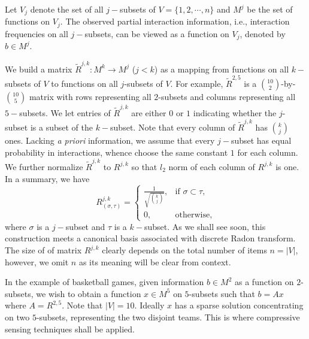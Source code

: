 \documentclass{article}
\begin{document}
Let $V_j$ denote the set of all $j-$subsets of $V=\{1,2,\cdots, n\}$ and $M^j$ be the set of functions on $V_j$. 
The observed partial interaction information, i.e., interaction frequencies on all $j-$subsets, can be viewed
as a function on $V_j$, denoted by $b\in M^j$.

We build a matrix $\tilde{R}^{j,k}:M^k \to M^j$ ($j<k$) as a mapping from functions on all $k-$subsets of $V$ to functions 
on all $j$-subsets of $V$. For example, $\tilde{R}^{2,5}$ is a ${10\choose 2}$-by-${10\choose 5}$ matrix
with rows representing all $2$-subsets and columns representing all $5-$subsets. We let
entries of $\tilde{R}^{j,k}$ are either $0$ or $1$ indicating whether the $j$-subset is a subset of
the $k-$subset. Note that every column of $\tilde{R}^{j,k}$ has ${k\choose j}$ ones. 
Lacking {\it a priori} information, we assume that every $j-$subset has equal probability in interactions, 
whence choose the same constant $1$ for each column. 
We further normalize $\tilde{R}^{j,k}$ to $R^{j,k}$ so that $l_2$ norm of each column of $R^{j,k}$ is one. In a summary, we have  
\begin{equation} \label{eq:radonmat}
R^{j,k}_{(\sigma,\tau)}=\left\{\begin{array}{cc} \frac{1}{\sqrt{{k \choose j}}}, & \mbox{if } \sigma\subset \tau, \\ 0, & \mbox{otherwise}, \end{array}\right.
\end{equation}
where $\sigma$ is a $j-$subset and $\tau$ is a $k-$subset. As we shall see soon, this construction meets a canonical basis associated with discrete Radon transform.
The size of of matrix $R^{j,k}$ clearly depends on the total number of items $n=|V|$, however, 
we omit $n$ as its meaning will be clear from context. 

In the example of basketball games, given information $b\in M^2$ as a function on $2$-subsets, we wish to obtain a function $x\in M^5$
on $5$-subsets such that $b=Ax$ where $A=R^{2,5}$. Note that $|V|=10$. Ideally $x$ has a sparse solution concentrating on two $5$-subsets, representing the two disjoint teams. This is where compressive sensing techniques shall be applied.
\end{document}

